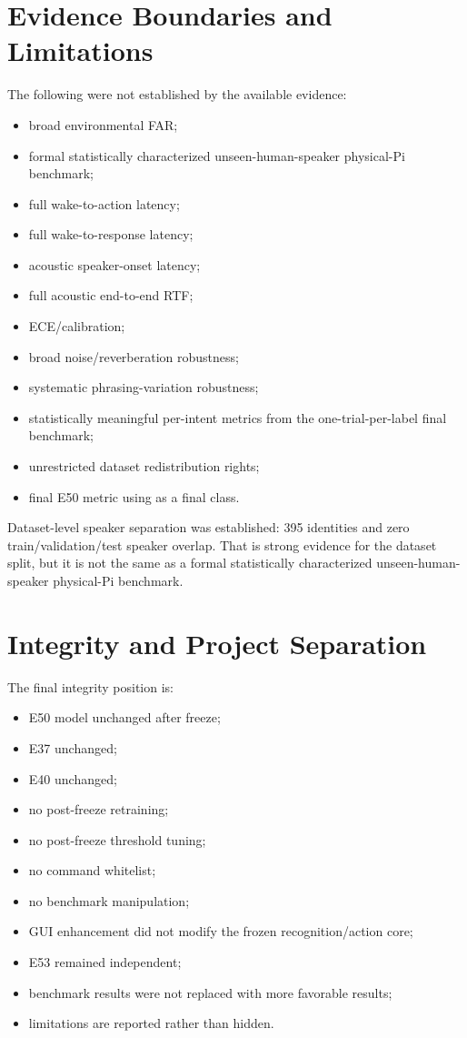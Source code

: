 \documentclass[11pt]{article}
\newcommand{\code}[1]{\texttt{\detokenize{#1}}}
\begin{document}
\section{Evidence Boundaries and Limitations}

The following were not established by the available evidence:

\begin{itemize}
\item broad environmental FAR;
\item formal statistically characterized unseen-human-speaker physical-Pi benchmark;
\item full wake-to-action latency;
\item full wake-to-response latency;
\item acoustic speaker-onset latency;
\item full acoustic end-to-end RTF;
\item ECE/calibration;
\item broad noise/reverberation robustness;
\item systematic phrasing-variation robustness;
\item statistically meaningful per-intent metrics from the one-trial-per-label final benchmark;
\item unrestricted dataset redistribution rights;
\item final E50 metric using \code{COLOR} as a final class.
\end{itemize}

Dataset-level speaker separation was established: 395 identities and zero train/validation/test speaker overlap. That is strong evidence for the dataset split, but it is not the same as a formal statistically characterized unseen-human-speaker physical-Pi benchmark.

\section{Integrity and Project Separation}

The final integrity position is:

\begin{itemize}
\item E50 model unchanged after freeze;
\item E37 unchanged;
\item E40 unchanged;
\item no post-freeze retraining;
\item no post-freeze threshold tuning;
\item no command whitelist;
\item no benchmark manipulation;
\item GUI enhancement did not modify the frozen recognition/action core;
\item E53 remained independent;
\item benchmark results were not replaced with more favorable results;
\item limitations are reported rather than hidden.
\end{itemize}
\end{document}
